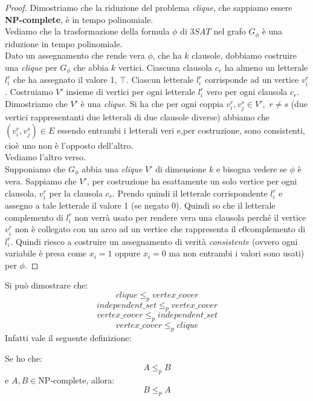 										\begin{proof}
											Dimostriamo che la riduzione del problema \textit{clique}, che sappiamo essere
											\textbf{NP-complete}, è in tempo polinomiale.\\ 
											Vediamo che la trasformazione della formula $\phi$ di $3SAT$ nel grafo
											$G_\phi$ è una riduzione in tempo polinomiale.\\
											Dato un assegnamento che rende vera $\phi$, che ha $k$ clausole, dobbiamo
											costruire una \textit{clique} per $G_\phi$ che abbia $k$ vertici. Ciascuna
											clausola $c_{r}$ ha almeno un letterale $l_{i}^r$ che ha assegnato il valore 1,
											$\top$. Ciascun letterale $l_{i}^r$ corrisponde ad un vertice
											$v_{i}^r$. Costruiamo $V'$ insieme di vertici per ogni letterale $l_i^r$ vero
											per ogni clausola $c_r$. Dimostriamo che $V'$ è una \textit{clique}. Si ha che
											per ogni coppia $v_i^r,v_j^s\in V',\,\,r\neq s$ (due vertici rappresentanti
											due letterali di due clausole diverse) abbiamo che $(v_i^r,v_j^s)\in
											E$ essendo entrambi i letterali veri e,per costruzione, sono consistenti, cioè
											uno non è l'opposto dell'altro.\\
											Vediamo l'altro verso.\\
											Supponiamo che $G_\phi$ abbia una \textit{clique} $V'$ di dimensione $k$ e
											bisogna vedere se $\phi$ è vera. Sappiamo che $V'$, per costruzione ha
											esattamente un solo vertice per ogni clausola, $v_i^r$ per la clausola
											$c_r$. Prendo quindi il letterale corrispondente $l_i^r$ e assegno a tale
											letterale il valore 1 (se negato 0). Quindi so che il letterale complemento di
											$l_i^r$ non verrà usato per rendere vera una clausola perché il vertice
											$v_i^r$ non è collegato con un arco ad un vertice che rappresenta il
											c0complemento di $l_i^r$. Quindi riesco a costruire un assegnamento di verità
											\textit{consistente} (ovvero ogni variabile è presa come $x_i=1$ oppure
											$x_i=0$ ma non entrambi i valori sono usati) per $\phi$.
										\end{proof}
										Si può dimostrare che:
										\[clique\leq_p vertex\_cover\]
										\[independent\_set\leq_p vertex\_cover\]
										\[vertex\_cover\leq_p independent\_set\]
										\[vertex\_cover\leq_p clique\]
										Infatti vale il seguente definizione:
										\begin{definizione}
											Se ho che:
											\[A\leq_p B\]
											e $A,B\in \mbox{NP-complete}$, allora:
											\[B\leq_p A\]
										\end{definizione}

